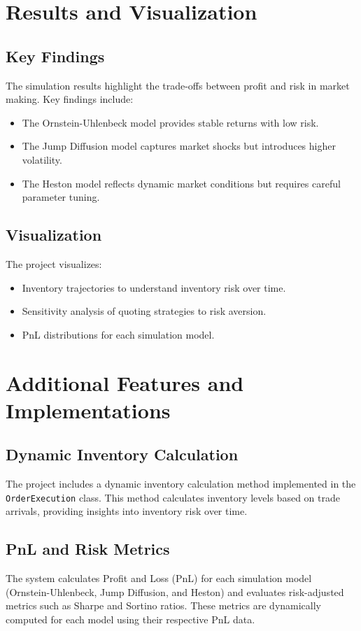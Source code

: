 \documentclass[12pt]{article}
\begin{document}
\section{Results and Visualization}
\subsection{Key Findings}
The simulation results highlight the trade-offs between profit and risk in market making. Key findings include:
\begin{itemize}
    \item The Ornstein-Uhlenbeck model provides stable returns with low risk.
    \item The Jump Diffusion model captures market shocks but introduces higher volatility.
    \item The Heston model reflects dynamic market conditions but requires careful parameter tuning.
\end{itemize}

\subsection{Visualization}
The project visualizes:
\begin{itemize}
    \item Inventory trajectories to understand inventory risk over time.
    \item Sensitivity analysis of quoting strategies to risk aversion.
    \item PnL distributions for each simulation model.
\end{itemize}

\section{Additional Features and Implementations}
\subsection{Dynamic Inventory Calculation}
The project includes a dynamic inventory calculation method implemented in the \texttt{OrderExecution} class. This method calculates inventory levels based on trade arrivals, providing insights into inventory risk over time.

\subsection{PnL and Risk Metrics}
The system calculates Profit and Loss (PnL) for each simulation model (Ornstein-Uhlenbeck, Jump Diffusion, and Heston) and evaluates risk-adjusted metrics such as Sharpe and Sortino ratios. These metrics are dynamically computed for each model using their respective PnL data.
\end{document}
